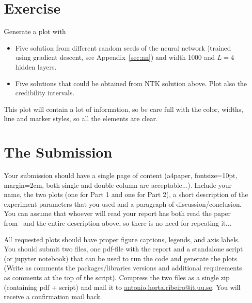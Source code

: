 \documentclass[a4paper,10pt]{article}
\begin{document}
\section*{Exercise}
Generate a plot with
\begin{itemize}
    \item Five solution from different random seeds of the neural network (trained using gradient descent, see Appendix~\ref{sec:nn}) and width 1000 and $L = 4$ hidden layers.
    \item Five solutions that could be obtained from NTK solution above. Plot also the credibility intervals.
\end{itemize}
This plot will contain a lot of information, so be care full with the color, widths, line and marker styles, so all the elements are clear.


\section*{The Submission}
Your submission should have a single page of content (a4paper, fontsize=10pt, margin=2cm, both single and double column are acceptable...).  Include your name, the two plots (one for Part 1 and one for Part 2), a short description of the experiment parameters that you used and a paragraph of discussion/conclusion. You can assume that whoever will read your report has both read the paper from~\citep{jacot_neural_2018} and the entire description above, so there is no need for repeating it...

All requested plots should have proper figure captions, legends, and axis labels. You should submit two files, one pdf-file with the report and a standalone script (or jupyter notebook) that can be used to run the code and generate the plots (Write as comments the packages/libraries versions and additional requirements as comments at the top of the script). Compress the two files as a single zip (containing pdf + script) and mail it to \href{mailto:antonio.horta.ribeiro@it.uu.se}{antonio.horta.ribeiro@it.uu.se}. You will receive a confirmation mail back.
\end{document}
